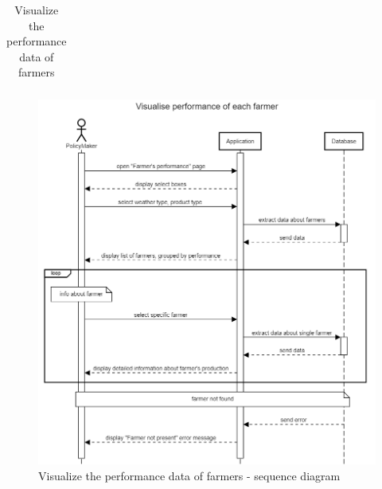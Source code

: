 \begin{table}[H]
\begin{tabular}{|l|p{}|}
    \end{tabular}
    \caption{\label{tab:visualize_farmer_performance}Visualize the performance data of farmers} 
\end{table}

\begin{figure}[H]
    \centering
    \includegraphics[scale=0.5]{Images/Sequence diagrams/SE2 - visualize performance (pm).png}
    \caption{Visualize the performance data of farmers - sequence diagram}
    \label{fig:seq_diag_visualize_performance}
\end{figure}

